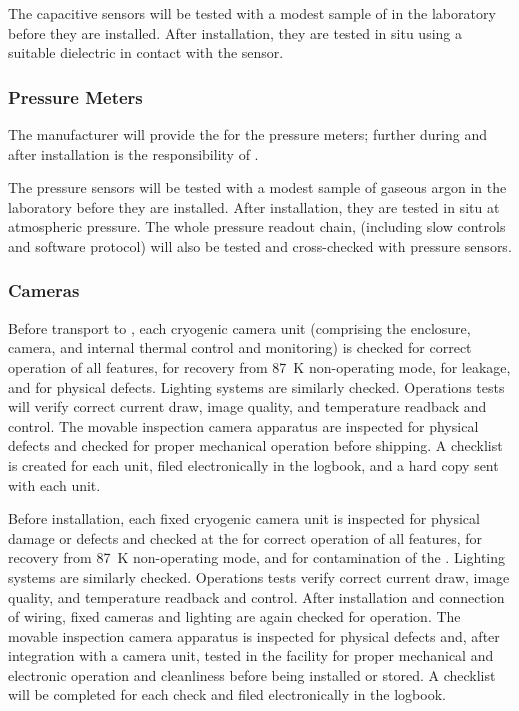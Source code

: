The capacitive sensors will be tested with a modest sample of  in the laboratory before they are installed. After installation, they are tested in situ %
using a suitable dielectric in contact with the sensor.

\subsubsection{Pressure Meters}
\label{sec:fdgen-slow-cryo-qc-press}
The manufacturer will provide the  for the pressure meters; further  during and after installation is the responsibility of .

The pressure sensors will be tested with a modest sample of gaseous argon in the laboratory before they are installed. After installation, they are tested in situ at atmospheric pressure. The whole pressure readout chain, (including slow controls  and software protocol) 
will also be tested and cross-checked with  pressure sensors.

\subsubsection{Cameras}
\label{sec:fdgen-slow-cryo-qc-c}

Before %
transport to , each cryogenic camera unit (comprising the enclosure, camera, and internal thermal control and monitoring) %
is checked for correct operation of all features, for recovery from \SI{87}{K} non-operating mode, for leakage, and for physical defects. Lighting systems %
are similarly checked. Operations tests will verify correct current draw, image quality, and temperature readback and control. The movable inspection camera apparatus %
are inspected for physical defects and checked for proper mechanical operation before shipping. A checklist %
is created for each unit, filed electronically in the  logbook, and a hard copy sent with each unit. 

Before installation, each fixed cryogenic camera unit is inspected for physical damage or defects and checked at the 
for correct operation of all features, for recovery from \SI{87}{K} non-operating mode, and for contamination of the . Lighting systems are similarly checked. Operations tests verify correct current draw, image quality, and temperature readback and control. After installation and connection of wiring, fixed cameras and lighting are again  checked for operation. The movable inspection camera apparatus is inspected for physical defects and, after integration with a camera unit, tested in the facility for proper mechanical and electronic operation and cleanliness before being installed or stored. A checklist will be completed for each  check and filed electronically in the  logbook. 

